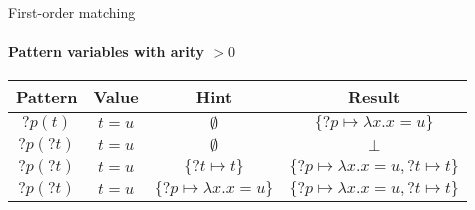 \begin{frame}{First-order matching}
\framesubtitle{Pattern variables with arity $> 0$}

\centering

\begin{tabular}{ccc|c}
Pattern & Value & Hint & Result \\[0.2cm]
\hline\hline
\rule{0pt}{1.25\normalbaselineskip}
${?p}(t)$ & $t = u$ & $\emptyset$ & $\{ {?p} \mapsto \lambda x. x = u \}$ \\[0.25cm]
${?p}({?t})$ & $t = u$ & $\emptyset$ & $\bot$ \\[0.25cm]
${?p}({?t})$ & $t = u$ & $\{ {?t} \mapsto t \}$ & $\{ {?p} \mapsto \lambda x. x = u, {?t} \mapsto t \}$ \\[0.25cm]
${?p}({?t})$ & $t = u$ & $\{ {?p} \mapsto \lambda x. x = u \}$ & $\{ {?p} \mapsto \lambda x. x = u, {?t} \mapsto t \}$
\end{tabular}


\end{frame}